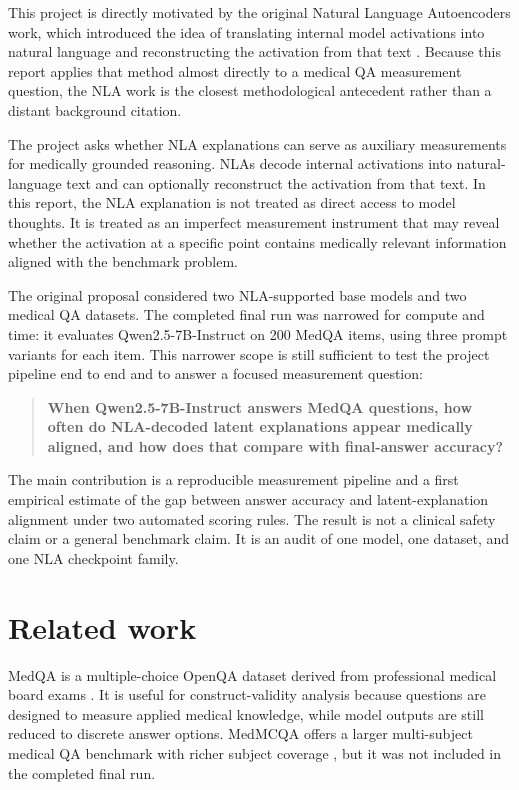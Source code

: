 \documentclass{article}
\begin{document}
This project is directly motivated by the original Natural Language Autoencoders work, which introduced the idea of translating internal model activations into natural language and reconstructing the activation from that text \citep{anthropic2026nla, kitft2026nla}. Because this report applies that method almost directly to a medical QA measurement question, the NLA work is the closest methodological antecedent rather than a distant background citation.

The project asks whether NLA explanations can serve as auxiliary measurements for medically grounded reasoning. NLAs decode internal activations into natural-language text and can optionally reconstruct the activation from that text. In this report, the NLA explanation is not treated as direct access to model thoughts. It is treated as an imperfect measurement instrument that may reveal whether the activation at a specific point contains medically relevant information aligned with the benchmark problem.

The original proposal considered two NLA-supported base models and two medical QA datasets. The completed final run was narrowed for compute and time: it evaluates Qwen2.5-7B-Instruct on 200 MedQA items, using three prompt variants for each item. This narrower scope is still sufficient to test the project pipeline end to end and to answer a focused measurement question:

\begin{quote}
\textbf{When Qwen2.5-7B-Instruct answers MedQA questions, how often do NLA-decoded latent explanations appear medically aligned, and how does that compare with final-answer accuracy?}
\end{quote}

The main contribution is a reproducible measurement pipeline and a first empirical estimate of the gap between answer accuracy and latent-explanation alignment under two automated scoring rules. The result is not a clinical safety claim or a general benchmark claim. It is an audit of one model, one dataset, and one NLA checkpoint family.

\section{Related work}

MedQA is a multiple-choice OpenQA dataset derived from professional medical board exams \citep{jin2020medqa}. It is useful for construct-validity analysis because questions are designed to measure applied medical knowledge, while model outputs are still reduced to discrete answer options. MedMCQA offers a larger multi-subject medical QA benchmark with richer subject coverage \citep{pal2022medmcqa}, but it was not included in the completed final run.
\end{document}
